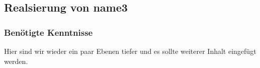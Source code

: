 \subsection{Realsierung von name3} 
\subsubsection{Benötigte Kenntnisse}

Hier sind wir wieder ein paar Ebenen tiefer und es sollte weiterer Inhalt eingefügt werden.
